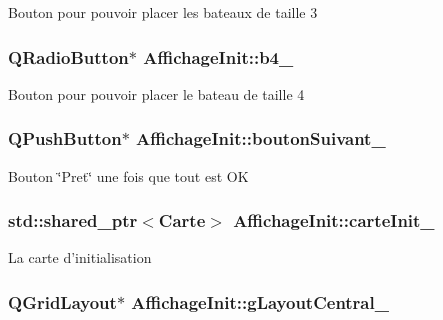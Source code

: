 Bouton pour pouvoir placer les bateaux de taille 3 \hypertarget{classAffichageInit_a364a79854751059ea883f4f111416e27}{
\subsubsection[{b4\+\_\+}]{\setlength{\rightskip}{0pt plus 5cm}Q\+Radio\+Button$\ast$ Affichage\+Init\+::b4\+\_\+\hspace{0.3cm}{\ttfamily [protected]}}}\label{classAffichageInit_a364a79854751059ea883f4f111416e27}
Bouton pour pouvoir placer le bateau de taille 4 \hypertarget{classAffichageInit_a2d5808b5c427d934c16b6ffb1046ea1a}{
\subsubsection[{bouton\+Suivant\+\_\+}]{\setlength{\rightskip}{0pt plus 5cm}Q\+Push\+Button$\ast$ Affichage\+Init\+::bouton\+Suivant\+\_\+\hspace{0.3cm}{\ttfamily [protected]}}}\label{classAffichageInit_a2d5808b5c427d934c16b6ffb1046ea1a}
Bouton \char`\"{}\+Pret\char`\"{} une fois que tout est O\+K \hypertarget{classAffichageInit_ae64aeadaa88e3d7b62c9b8edb77f4bc1}{
\subsubsection[{carte\+Init\+\_\+}]{\setlength{\rightskip}{0pt plus 5cm}std\+::shared\+\_\+ptr$<${\bf Carte}$>$ Affichage\+Init\+::carte\+Init\+\_\+\hspace{0.3cm}{\ttfamily [protected]}}}\label{classAffichageInit_ae64aeadaa88e3d7b62c9b8edb77f4bc1}
La carte d'initialisation \hypertarget{classAffichageInit_a6cfa8eefd38ed8397269da4b472d7ad5}{
\subsubsection[{g\+Layout\+Central\+\_\+}]{\setlength{\rightskip}{0pt plus 5cm}Q\+Grid\+Layout$\ast$ Affichage\+Init\+::g\+Layout\+Central\+\_\+\hspace{0.3cm}{\ttfamily [protected]}}}\label{classAffichageInit_a6cfa8eefd38ed8397269da4b472d7ad5}
